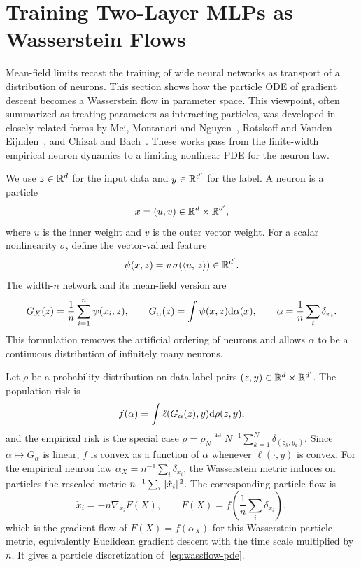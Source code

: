 \section{Training Two-Layer MLPs as Wasserstein Flows}
\label{sec-wasserstein-flows-mlp}

Mean-field limits recast the training of wide neural networks as transport of a distribution of neurons. This section shows how the particle ODE of gradient descent becomes a Wasserstein flow in parameter space. This viewpoint, often summarized as treating parameters as interacting particles, was developed in closely related forms by Mei, Montanari and Nguyen~\cite{MeiMontanariNguyen2018MeanFieldNN}, Rotskoff and Vanden-Eijnden~\cite{RotskoffVandenEijnden2018Trainability}, and Chizat and Bach~\cite{ChizatBach2018OverparameterizedOT}. These works pass from the finite-width empirical neuron dynamics to a limiting nonlinear PDE for the neuron law.

We use $z\in\mathbb{R}^d$ for the input data and $y\in\mathbb{R}^{d'}$ for the label. A neuron is a particle
\[
	x=(u,v)\in\mathbb{R}^d\times\mathbb{R}^{d'},
\]
where $u$ is the inner weight and $v$ is the outer vector weight. For a scalar nonlinearity $\sigma$, define the vector-valued feature
\[
	\psi(x,z)=v\,\sigma(\langle u,\,z\rangle)\in\mathbb{R}^{d'}.
\]
The width-$n$ network and its mean-field version are
\[
	G_X(z)=\frac1n\sum_{i=1}^n\psi(x_i,z),
	\qquad
	G_\alpha(z)=\int\psi(x,z)\mathrm{d}\alpha(x),
	\qquad
	\alpha=\frac1n\sum_i\delta_{x_i}.
\]
This formulation removes the artificial ordering of neurons and allows $\alpha$ to be a continuous distribution of infinitely many neurons.

Let $\rho$ be a probability distribution on data-label pairs $(z,y)\in\mathbb{R}^d\times\mathbb{R}^{d'}$. The population risk is
\[
	f(\alpha)=\int \ell(G_\alpha(z),y)\mathrm{d}\rho(z,y),
\]
and the empirical risk is the special case $\rho=\rho_N\eqdef N^{-1}\sum_{k=1}^N\delta_{(z_k,y_k)}$. Since $\alpha\mapsto G_\alpha$ is linear, $f$ is convex as a function of $\alpha$ whenever $\ell(\cdot,y)$ is convex. For the empirical neuron law $\alpha_X=n^{-1}\sum_i\delta_{x_i}$, the Wasserstein metric induces on particles the rescaled metric $n^{-1}\sum_i|\!| \dot x_i |\!|^2$. The corresponding particle flow is
\[
	\dot x_i=-n\nabla_{x_i}F(X),
	\qquad
	F(X)=f\!\left(\frac1n\sum_i\delta_{x_i}\right),
\]
which is the gradient flow of $F(X)=f(\alpha_X)$ for this Wasserstein particle metric, equivalently Euclidean gradient descent with the time scale multiplied by $n$. It gives a particle discretization of~\eqref{eq:wassflow-pde}.

